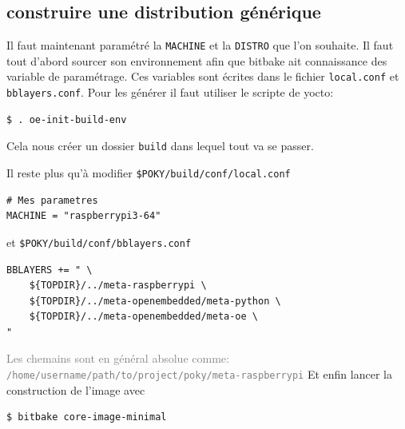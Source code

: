 \documentclass[compress]{smilebeamer}
\begin{document}
\subsection{construire une distribution générique}
\begin{frame}[fragile]
Il faut maintenant paramétré la \texttt{MACHINE} et la \texttt{DISTRO} que l'on souhaite.\newline
Il faut tout d'abord sourcer son environnement afin que bitbake ait connaissance des variable de paramétrage.\newline
Ces variables sont écrites dans le fichier \texttt{local.conf} et \texttt{bblayers.conf}.\newline
\newline
Pour les générer il faut utiliser le scripte de yocto:
\begin{lstlisting}[style=shell]
$ . oe-init-build-env
\end{lstlisting}
Cela nous créer un dossier \texttt{build} dans lequel tout va se passer.
\end{frame}

\begin{frame}[fragile]
	Il reste plus qu'à modifier \texttt{\$POKY/build/conf/local.conf}
\begin{lstlisting}[style=bitbake]
# Mes parametres
MACHINE = "raspberrypi3-64"
\end{lstlisting}
et \texttt{\$POKY/build/conf/bblayers.conf}
\begin{lstlisting}[style=bitbake]
BBLAYERS += " \
    ${TOPDIR}/../meta-raspberrypi \
    ${TOPDIR}/../meta-openembedded/meta-python \
    ${TOPDIR}/../meta-openembedded/meta-oe \
"
\end{lstlisting}
\textcolor{gray}{\tiny{Les chemains sont en général absolue comme: \texttt{/home/username/path/to/project/poky/meta-raspberrypi}}}\newline
Et enfin lancer la construction de l'image avec
\begin{lstlisting}[style=shell]
$ bitbake core-image-minimal
\end{lstlisting}
\end{frame}
\end{document}
